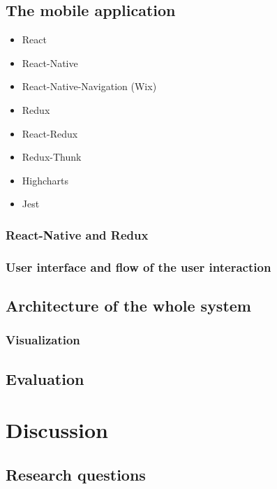 \documentclass[a4paper,12pt]{book}
\begin{document}
\section{The mobile application}
\begin{itemize}
	\item React
	\item React-Native
	\item React-Native-Navigation (Wix)
	\item Redux
	\item React-Redux
	\item Redux-Thunk
	\item Highcharts
	\item Jest
\end{itemize}
\subsection{React-Native and Redux}
\subsection{User interface and flow of the user interaction}
\section{Architecture of the whole system}
\subsection{Visualization}
\section{Evaluation}



\chapter{Discussion}
\section{Research questions}
\end{document}

